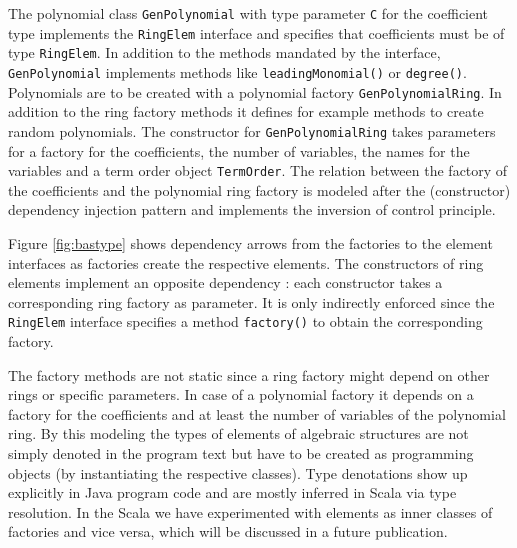 \documentclass{llncs}
\newcommand{\code}[1]{\texttt{#1}}
\begin{document}

The polynomial class \code{Gen\-Polynomial} with type parameter
\code{C} for the coefficient type implements the \code{Ring\-Elem}
interface and specifies that coefficients must be of type
\code{Ring\-Elem}.  In addition to the methods mandated by the
interface, \code{Gen\-Polynomial} implements methods like
\code{leading\-Monomial()} or \code{degree()}.  Polynomials are to be
created with a polynomial factory \code{Gen\-Polynomial\-Ring}. In
addition to the ring factory methods it defines for example methods
to create random polynomials.  The constructor for
\code{Gen\-Polynomial\-Ring} takes parameters for a factory for the
coefficients, the number of variables, the names for the variables and
a term order object \code{Term\-Order}. The relation between the
factory of the coefficients and the polynomial ring factory is modeled
after the (constructor) dependency injection pattern and implements the
inversion of control principle.

Figure \ref{fig:bastype} shows dependency arrows from the factories to
the element interfaces as factories create the respective elements.
The constructors of ring elements implement an opposite
dependency : each constructor takes a corresponding ring
factory as parameter.  It is only indirectly enforced since the
\code{RingElem} interface specifies a method \code{factory()} to
obtain the corresponding factory.

The factory methods are not static 
since a ring factory might depend on other rings or specific
parameters. In case of a polynomial factory it depends on a factory
for the coefficients and at least the number of variables of the
polynomial ring. By this modeling the types of elements of algebraic
structures are not simply denoted in the program text but have to be
created as programming objects (by instantiating the respective
classes). Type denotations show up explicitly in Java program code and
are mostly inferred in Scala via type resolution. In the Scala we have
experimented with elements as inner classes of factories and vice
versa, which will be discussed in a future publication.
\end{document}
